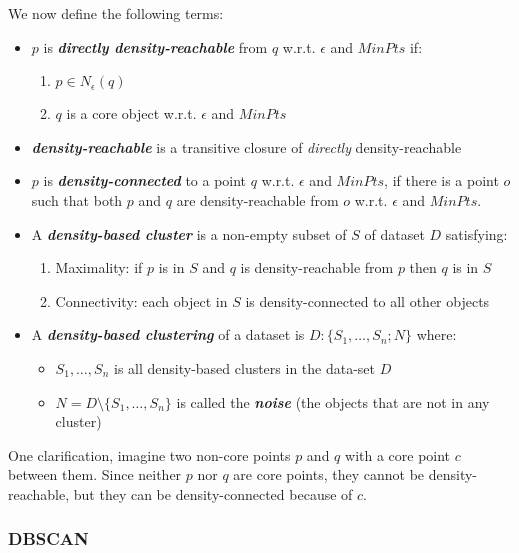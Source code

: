     We now define the following terms:
    \begin{itemize}
        \item $p$ is \textbf{\textit{directly density-reachable}} from $q$ 
        w.r.t. $\epsilon$ and $MinPts$ if:
        \begin{enumerate}
            \item $p \in N_\epsilon(q)$
            \item $q$ is a core object w.r.t. $\epsilon$ and $MinPts$
        \end{enumerate}
        \item \textbf{\textit{density-reachable}} is a transitive closure of 
        \textit{directly} density-reachable
        \item $p$ is \textbf{\textit{density-connected}} to a point $q$ w.r.t. 
        $\epsilon$ and $MinPts$, if there is a point $o$ such that both $p$ and 
        $q$ are density-reachable from $o$ w.r.t. $\epsilon$ and $MinPts$.
        \item A \textbf{\textit{density-based cluster}} is a non-empty subset 
        of $S$ of dataset $D$ satisfying:
        \begin{enumerate}
            \item Maximality: if $p$ is in $S$ and $q$ is density-reachable 
            from $p$ then $q$ is in $S$
            \item Connectivity: each object in $S$ is density-connected to all 
            other objects
        \end{enumerate}
        \item A \textbf{\textit{density-based clustering}} of a dataset is 
        $D:\{S_1,\dots,S_n;N\}$ where:
        \begin{itemize}
            \item $S_1,\dots, S_n$ is all density-based clusters in the 
            data-set $D$
            \item $N=D \setminus \{S_1,\dots,S_n\}$ is called the 
            \textbf{\textit{noise}} (the objects that are not in any cluster)
        \end{itemize}
    \end{itemize}
    One clarification, imagine two non-core points $p$ and $q$ with a core 
    point $c$ between them. Since neither $p$ nor $q$ are core points, they 
    cannot be density-reachable, but they can be density-connected because of 
    $c$.
    
    \subsubsection{DBSCAN}
    

